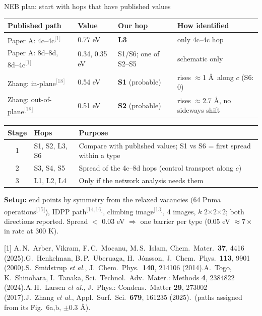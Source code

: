 \documentclass[aspectratio=169,10pt]{beamer}
\newcommand{\cit}[1]{\textsuperscript{\textcolor{gray}{[#1]}}}
\newcommand{\refs}[1]{\par\vfill\begingroup\tiny\color{gray}\raggedright #1\par\endgroup}
\newcommand{\RA}{[1] A.\,N.~Arber, Vikram, F.\,C.~Mocanu, M.\,S.~Islam, Chem.\ Mater.\ \textbf{37}, 4416 (2025).}
\newcommand{\RO}{[13] G.~Henkelman, B.\,P.~Uberuaga, H.~J\'onsson, J.\ Chem.\ Phys.\ \textbf{113}, 9901 (2000).}
\newcommand{\RP}{[14] S.~Smidstrup \emph{et al.}, J.\ Chem.\ Phys.\ \textbf{140}, 214106 (2014).}
\newcommand{\RQ}{[15] A.~Togo, K.~Shinohara, I.~Tanaka, Sci.\ Technol.\ Adv.\ Mater.: Methods \textbf{4}, 2384822 (2024).}
\newcommand{\RR}{[16] A.\,H.~Larsen \emph{et al.}, J.\ Phys.: Condens.\ Matter \textbf{29}, 273002 (2017).}
\newcommand{\RT}{[18] J.~Zhang \emph{et al.}, Appl.\ Surf.\ Sci.\ \textbf{679}, 161235 (2025).}
\begin{document}
\begin{frame}{NEB plan: start with hops that have published values}
  \scriptsize
  \begin{tabular}{llll}
    \toprule
    Published path & Value & Our hop & How identified \\
    \midrule
    Paper A: 4c--4c\cit{1} & 0.77 eV & \textbf{L3} & only 4c--4c hop \\
    Paper A: 8d--8d, 8d--4c\cit{1} & 0.34, 0.35 eV & S1/S6; one of S2--S5 & schematic only \\
    Zhang: in-plane\cit{18} & 0.54 eV & \textbf{S1} (probable) & rises $\approx$1 \AA\ along $c$ (S6: 0) \\
    Zhang: out-of-plane\cit{18} & 0.51 eV & \textbf{S2} (probable) & rises $\approx$2.7 \AA, no sideways shift \\
    \bottomrule
  \end{tabular}

  \vspace{0.3em}
  \begin{tabular}{clp{}}
    \toprule
    Stage & Hops & Purpose \\
    \midrule
    1 & S1, S2, L3, S6 & Compare with published values; S1 vs S6 = first spread within a type \\
    2 & S3, S4, S5 & Spread of the 4c--8d hops (control transport along $c$) \\
    3 & L1, L2, L4 & Only if the network analysis needs them \\
    \bottomrule
  \end{tabular}

  \vspace{0.3em}
  \textbf{Setup:} end points by symmetry from the relaxed vacancies (64 Pnma operations\cit{15}), IDPP path\cit{14,16}, climbing image\cit{13}, 4 images, $k$ 2$\times$2$\times$2; both directions reported. Spread $<$ 0.03 eV $\Rightarrow$ one barrier per type (0.05 eV $\approx 7\times$ in rate at 300 K).
  \refs{\RA\quad \RO\quad \RP\quad \RQ\quad \RR\quad \RT\ (paths assigned from its Fig.~6a,b, $\pm$0.3 \AA).}
\end{frame}
\end{document}
